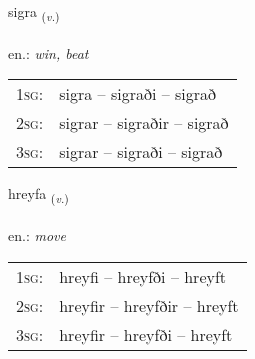 \documentclass[frontgrid, backgrid]{flacards}\usepackage[]{graphicx}\usepackage[]{xcolor}
\begin{document}
\renewcommand{\blhead}{\vskip5pt {\small\bfseries\footnotesize Sagnorð | Verb }}
\renewcommand{\bcfoot}{\vskip5pt \hspace{2pt}{\small\bfseries\footnotesize 2K}}


{sigra \small{\textsubscript{(\textit{v.})}} \\[1ex] %
\textphonetic{[sɪɣra]} \\
en.: \emph{win, beat} \\  [2ex]
\renewcommand*{\arraystretch}{0.8}
\begin{tabular}{p{1cm}l}
\textsc{1sg}: & sigra -- sigraði -- sigrað \\ 
\textsc{2sg}: & sigrar -- sigraðir -- sigrað \\ 
\textsc{3sg}: & sigrar -- sigraði -- sigrað \\ 
\end{tabular}
}

\renewcommand{\flhead}{\vskip5pt \fboxsep=0pt {\small\bfseries\footnotesize Sagnorð | Verb}}
\renewcommand{\fcfoot}{\vskip5pt \fboxsep=0pt \hspace{2pt}{\small\bfseries\footnotesize 2K}}

\renewcommand{\blhead}{\vskip5pt {\small\bfseries\footnotesize Sagnorð | Verb }}
\renewcommand{\bcfoot}{\vskip5pt \hspace{2pt}{\small\bfseries\footnotesize 2K}}


{hreyfa \small{\textsubscript{(\textit{v.})}} \\[1ex] %
\textphonetic{[r̥eiːva]} \\
en.: \emph{move} \\  [2ex]
\renewcommand*{\arraystretch}{0.8}
\begin{tabular}{p{1cm}l}
\textsc{1sg}: & hreyfi -- hreyfði -- hreyft \\ 
\textsc{2sg}: & hreyfir -- hreyfðir -- hreyft \\ 
\textsc{3sg}: & hreyfir -- hreyfði -- hreyft \\ 
\end{tabular}
}
\end{document}
